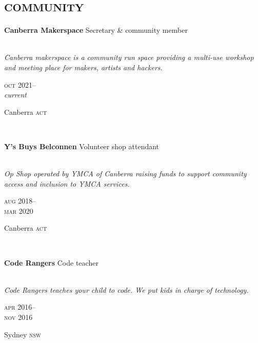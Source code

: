
\section*{\textsc{community}}
\vspace{-0.2cm}

\begin{minipage}[t]{\mainboxwidth\textwidth}
\textbf{Canberra Makerspace}\phantom{..} Secretary \& community member\\
\\
{\small
\textit{Canberra makerspace is a community run space providing a multi-use workshop and meeting place for makers, artists and hackers.}
\par}
\end{minipage}
\begin{minipage}[t]{\detailboxwidth\textwidth}
{
\hfill \textsc{oct} 2021--\\ 
\hspace*{0pt} \hfill \textit{current}
\par
{\small\hfill Canberra \textsc{act}}
}
\end{minipage}
\\

\begin{minipage}[t]{\mainboxwidth\textwidth}
\textbf{Y's Buys Belconnen}\phantom{..} Volunteer shop attendant\\
\\
{\small
\textit{Op Shop operated by YMCA of Canberra raising funds to support community access and inclusion to YMCA services.}
\par}
\end{minipage}
\begin{minipage}[t]{\detailboxwidth\textwidth}
{
\hfill \textsc{aug} 2018--\\ 
\hspace*{0pt} \hfill \textsc{mar} 2020
\par
{\small\hfill Canberra \textsc{act}}
}
\end{minipage}
\\

\begin{minipage}[t]{\mainboxwidth\textwidth}
\textbf{Code Rangers}\phantom{..} Code teacher \\
\\
{\small
\textit{Code Rangers teaches your child to code. We put kids in charge of technology.}
\par}
\end{minipage}
\begin{minipage}[t]{\detailboxwidth\textwidth}
{
\hfill \textsc{apr} 2016--\\ 
\hspace*{0pt} \hfill \textsc{nov} 2016
\par
{\small\hfill Sydney \textsc{nsw}}
}
\end{minipage}
\\

